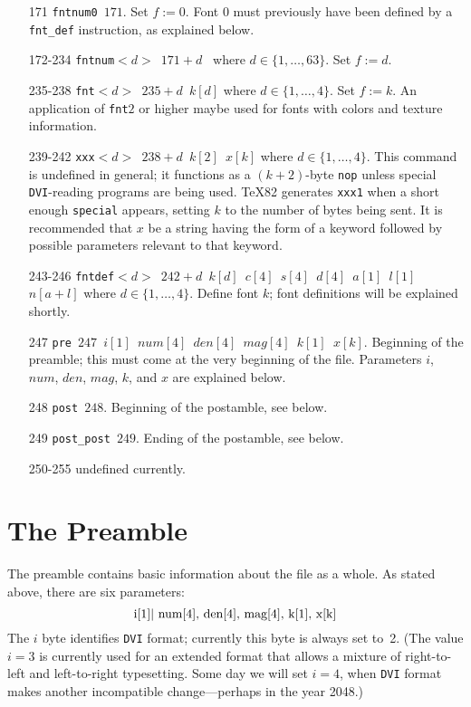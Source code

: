 \documentclass[10pt, a4paper]{article}
\begin{document}
\begin{itemize}
\item[171] \texttt{fntnum0 $171$}. 
Set $f:=0$. Font 0 must previously have been
defined by a \texttt{fnt\_def} instruction, as explained below.

\item[172-234] \texttt{fntnum$<d>$ $171+d$ } where $d\in\{1,\dots,63\}$. 
Set $f:=d$. 


\item[235-238] \texttt{fnt$<d>$ $235+d$ $k[d]$} where $d\in\{1,\dots,4\}$. 
Set $f:=k$. 
An application of \texttt{fnt$2$} or higher 
maybe used for fonts with colors and texture information. 

\item[239-242] \texttt{xxx$<d>$ $238+d$ $k[2]$ $x[k]$} 
where $d\in\{1,\dots,4\}$. 
This command is undefined in general; 
it functions as a $(k+2)$-byte \texttt{nop} 
unless special \texttt{DVI}-reading programs are being used. 
\TeX82 generates \texttt{xxx1} when a short enough \texttt{special} appears, 
setting $k$ to the number of bytes being sent. 
It is recommended that $x$ be a string having the form of a keyword 
followed by possible parameters relevant to that keyword.

\item[243-246] \texttt{fntdef$<d>$ $242+d$ 
$k[d]$ $c[4]$ $s[4]$ $d[4]$ $a[1]$ $l[1]$ $n[a+l]$} 
where $d\in\{1,\dots,4\}$. 
Define font $k$; font definitions will be explained shortly.

\item[247] \texttt{pre $247$ $i[1]$ $num[4]$ $den[4]$ $mag[4]$ $k[1]$ $x[k]$}.
Beginning of the preamble; 
this must come at the very beginning of the file. 
Parameters $i$, $num$, $den$, $mag$, $k$, and $x$ are explained below.

\item[248] \texttt{post $248$}. 
Beginning of the postamble, see below. 

\item[249] \texttt{post\_post $249$}. 
Ending of the postamble, see below. 

\item[250-255] undefined currently. 
\end{itemize}

\section{The Preamble}
\label{sec:preamble}

The preamble contains basic information about the file as a whole. 
As stated above, there are six parameters:
%
\[
\hbox{i[1]| num[4], den[4], mag[4], k[1], x[k]}
\]
%
The $i$ byte identifies \texttt{DVI} format; 
currently this byte is always set to~2. 
(The value $i=3$ is currently used for an extended format that
allows a mixture of right-to-left and left-to-right typesetting.
Some day we will set $i=4$, when \texttt{DVI} format makes another
incompatible change---perhaps in the year 2048.)
\end{document}
